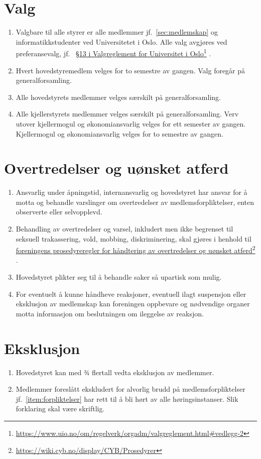 \documentclass[8pt,norsk,a4paper]{article}
\newcommand\fhref[2]{%
	\href{#1}{#2}\footnote{\url{#1}}%
}
\begin{document}
\section{Valg}\label{sec:valg}
\begin{enumerate}
	\item{Valgbare til alle styrer er alle medlemmer jf.~\ref{sec:medlemskap} og informatikkstudenter ved Universitetet i Oslo. Alle valg avgjøres ved preferansevalg, jf.~\fhref{https://www.uio.no/om/regelverk/orgadm/valgreglement.html\#vedlegg-2}{§13 i Valgreglement for Universitet i Oslo}.}
	\item{Hvert hovedstyremedlem velges for to semestre av gangen. Valg foregår på generalforsamling.}
	\item{Alle hovedstyrets medlemmer velges særskilt på generalforsamling.}
	\item{Alle kjellerstyrets medlemmer velges særskilt på generalforsamling. Verv utover kjellermogul og økonomiansvarlig velges for ett semester av gangen. Kjellermogul og økonomiansvarlig velges for to semestre av gangen. }
\end{enumerate}

\section{Overtredelser og uønsket atferd}
\begin{enumerate}
	\item Ansvarlig under åpningstid, internansvarlig og hovedstyret har ansvar for å motta og behandle varslinger om overtredelser av medlemsforpliktelser, enten observerte eller selvopplevd.
	\item Behandling av overtredelser og varsel, inkludert men ikke begrenset til seksuell trakassering, vold, mobbing, diskriminering, skal gjøres i henhold til \fhref{https://wiki.cyb.no/display/CYB/Prosedyrer}{foreningens prosedyreregler for håndtering av overtredelser og uønsket atferd}.
	\item Hovedstyret plikter seg til å behandle saker så upartisk som mulig.
	\item For eventuelt å kunne håndheve reaksjoner, eventuell ilagt suspensjon eller eksklusjon av medlemskap kan foreningen oppbevare og nødvendige organer motta informasjon om beslutningen om ileggelse av reaksjon.
\end{enumerate}

\section{Eksklusjon}
\begin{enumerate}
	\item Hovedstyret kan med ¾ flertall vedta eksklusjon av medlemmer.
	\item Medlemmer foreslått ekskludert for alvorlig brudd på medlemsforpliktelser jf.~\ref{item:forpliktelser} har rett til å bli hørt av alle høringsinstanser. Slik forklaring skal være skriftlig.
\end{enumerate}
\end{document}

